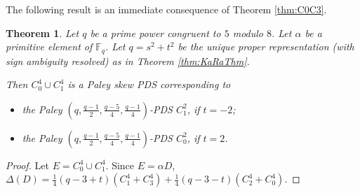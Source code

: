 \documentclass[12pt, a4paper]{article}
\newtheorem{theorem}{Theorem}[section]
\theoremstyle{definition}
\begin{document}
The following result is an immediate consequence of Theorem \ref{thm:C0C3}.
\begin{theorem}\label{thm:C0C1}
Let $q$ be a prime power congruent to $5$ modulo $8$. Let $\alpha$ be a primitive element of $\mathbb{F}_q$. Let $q=s^2+t^2$ be the unique proper representation (with sign ambiguity resolved) as in Theorem \ref{thm:KaRaThm}. 

Then $C_0^4 \cup C_1^4$ is a Paley skew PDS corresponding to 
\begin{itemize}
    \item[(i)] the Paley $(q,\frac{q-1}{2}, \frac{q-5}{4}, \frac{q-1}{4})$-PDS  $C_1^2$, if $t=-2$; 
    \item[(ii)] the Paley $(q,\frac{q-1}{2}, \frac{q-5}{4}, \frac{q-1}{4})$-PDS  $C_0^2$, if $t=2$.
\end{itemize}
\end{theorem}
\begin{proof}
Let $E=C_0^4 \cup C_1^4$.  Since $E=\alpha D$, $\Delta(D)=\frac{1}{4}(q-3+t)(C_1^4+C_3^4) + \frac{1}{4}(q-3-t)(C_2^4+C_0^4)$.
\end{proof}
\end{document}
